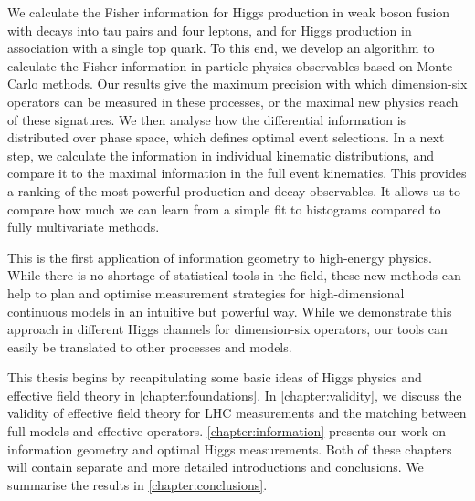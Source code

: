 We calculate the Fisher information for Higgs production in weak boson
fusion with decays into tau pairs and four leptons, and for Higgs
production in association with a single top quark. To this end, we
develop an algorithm to calculate the Fisher information in
particle-physics observables based on Monte-Carlo methods. Our results
give the maximum precision with which dimension-six operators can be
measured in these processes, or the maximal new physics reach of these
signatures. We then analyse how the differential information is
distributed over phase space, which defines optimal event
selections. In a next step, we calculate the information in individual
kinematic distributions, and compare it to the maximal information in
the full event kinematics. This provides a ranking of the most
powerful production and decay observables. It allows us to compare how
much we can learn from a simple fit to histograms compared to fully
multivariate methods.

This is the first application of information geometry to high-energy
physics. While there is no shortage of statistical tools in the field,
these new methods can help to plan and optimise measurement strategies
for high-dimensional continuous models in an intuitive but powerful
way. While we demonstrate this approach in different Higgs channels
for dimension-six operators, our tools can easily be translated to other
processes and models.

\newparagraph
%
This thesis begins by recapitulating some basic ideas of Higgs physics
and effective field theory in \autoref{chapter:foundations}. In
\autoref{chapter:validity}, we discuss the validity of effective
field theory for LHC measurements and the matching between full models
and effective operators. \autoref{chapter:information} presents
our work on information geometry and optimal Higgs measurements. Both
of these chapters will contain separate and more detailed introductions
and conclusions. We summarise the results in
\autoref{chapter:conclusions}.
